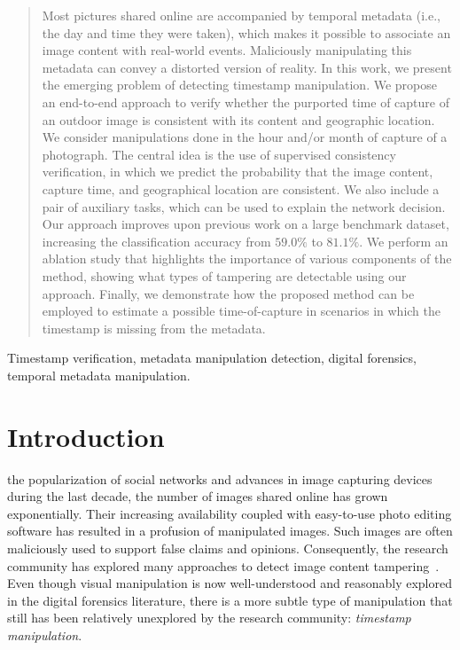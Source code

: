 \documentclass[journal]{IEEEtran}
\begin{document}
\begin{abstract}
Most pictures shared online are accompanied by temporal metadata (i.e., the day and time they were taken),  which makes it possible to associate an image content with real-world events. Maliciously manipulating this metadata can convey a distorted version of reality. In this work, we present the emerging problem of detecting timestamp manipulation. We propose an end-to-end approach to verify whether the purported time of capture of an outdoor image is consistent with its content and geographic location. We consider manipulations done in the hour and/or month of capture of a photograph. The central idea is the use of supervised consistency verification, in which we predict the probability that the image content, capture time, and geographical location are consistent. We also include a pair of auxiliary tasks, which can be used to explain the network decision. Our approach improves upon previous work on a large benchmark dataset, increasing the classification accuracy from $59.0\%$ to $81.1\%$. We perform an ablation study that highlights the importance of various components of the method, showing what types of tampering are detectable using our approach. Finally, we demonstrate how the proposed method can be employed to estimate a possible time-of-capture in scenarios in which the timestamp is missing from the metadata. 
\end{abstract}

\begin{IEEEkeywords}
Timestamp verification, metadata manipulation detection, digital forensics, temporal metadata manipulation.
\end{IEEEkeywords}






\IEEEpeerreviewmaketitle


\section{Introduction}
     the popularization of social networks and advances in image capturing devices during the last decade, the number of images shared online has grown exponentially. Their increasing availability coupled with easy-to-use photo editing software has resulted in a profusion of manipulated images. Such images are often maliciously used to support false claims and opinions. Consequently, the research community has explored many approaches to detect image content tampering~\cite{christlein2012evaluation, zhou2018learning, huh2018fighting}. Even though visual manipulation is now well-understood and reasonably explored in the digital forensics literature, there is a more subtle type of manipulation that still has been relatively unexplored by the research community: \emph{timestamp manipulation}. 
    
\end{document}
